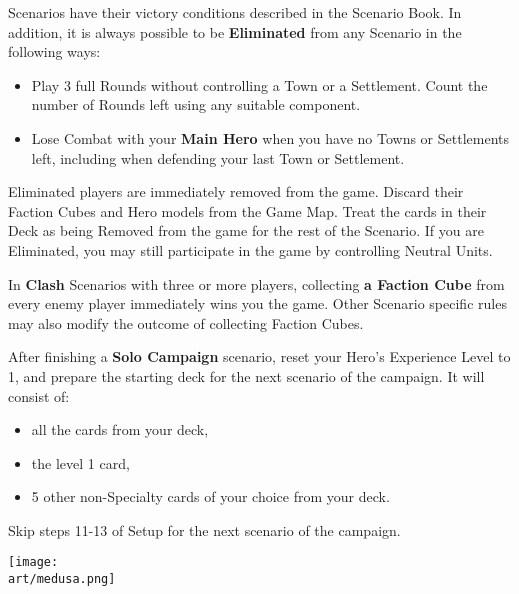 
\begin{multicols*}{2}

 Scenarios have their victory conditions described in the Scenario Book.
In addition, it is always possible to be \textbf{Eliminated} from any Scenario in the following ways:
\begin{itemize}
  \item Play 3 full Rounds without controlling a Town or a Settlement.
    Count the number of Rounds left using any suitable component.
  \item Lose Combat with your \textbf{Main Hero} when you have no Towns or Settlements left, including when defending your last Town or Settlement.
\end{itemize}
Eliminated players are immediately removed from the game.
Discard their Faction Cubes and Hero models from the Game Map.
Treat the cards in their Deck as being Removed from the game for the rest of the Scenario.
If you are Eliminated, you may still participate in the game by controlling Neutral Units.\par
{}\par

In \textbf{Clash} Scenarios with three or more players, collecting \textbf{a Faction Cube} from every enemy player immediately wins you the game.
Other Scenario specific rules may also modify the outcome of collecting Faction Cubes.

\columnbreak

After finishing a \textbf{Solo Campaign} scenario, reset your Hero's Experience Level to 1, and prepare the starting deck for the next scenario of the campaign.
It will consist of:
\begin{itemize}
  \item all the  cards from your deck,
  \item the level 1  card,
  \item 5 other non-Specialty cards of your choice from your deck.
\end{itemize}
Skip steps 11-13 of Setup for the next scenario of the campaign.

\vspace*{\fill}
\hspace{-3em}
\texttt{[image: \\art/medusa.png]}

\end{multicols*}
